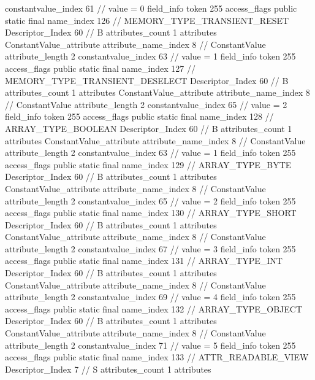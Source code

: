 {{{{{{{					constantvalue_index	61		// value = 0
				}
				}
			}
			field_info {
				token	255
				access_flags	public static final
				name_index	126		// MEMORY_TYPE_TRANSIENT_RESET
				Descriptor_Index	60		// B
				attributes_count	1
				attributes {
				ConstantValue_attribute {
					attribute_name_index	8		// ConstantValue
					attribute_length	2
					constantvalue_index	63		// value = 1
				}
				}
			}
			field_info {
				token	255
				access_flags	public static final
				name_index	127		// MEMORY_TYPE_TRANSIENT_DESELECT
				Descriptor_Index	60		// B
				attributes_count	1
				attributes {
				ConstantValue_attribute {
					attribute_name_index	8		// ConstantValue
					attribute_length	2
					constantvalue_index	65		// value = 2
				}
				}
			}
			field_info {
				token	255
				access_flags	public static final
				name_index	128		// ARRAY_TYPE_BOOLEAN
				Descriptor_Index	60		// B
				attributes_count	1
				attributes {
				ConstantValue_attribute {
					attribute_name_index	8		// ConstantValue
					attribute_length	2
					constantvalue_index	63		// value = 1
				}
				}
			}
			field_info {
				token	255
				access_flags	public static final
				name_index	129		// ARRAY_TYPE_BYTE
				Descriptor_Index	60		// B
				attributes_count	1
				attributes {
				ConstantValue_attribute {
					attribute_name_index	8		// ConstantValue
					attribute_length	2
					constantvalue_index	65		// value = 2
				}
				}
			}
			field_info {
				token	255
				access_flags	public static final
				name_index	130		// ARRAY_TYPE_SHORT
				Descriptor_Index	60		// B
				attributes_count	1
				attributes {
				ConstantValue_attribute {
					attribute_name_index	8		// ConstantValue
					attribute_length	2
					constantvalue_index	67		// value = 3
				}
				}
			}
			field_info {
				token	255
				access_flags	public static final
				name_index	131		// ARRAY_TYPE_INT
				Descriptor_Index	60		// B
				attributes_count	1
				attributes {
				ConstantValue_attribute {
					attribute_name_index	8		// ConstantValue
					attribute_length	2
					constantvalue_index	69		// value = 4
				}
				}
			}
			field_info {
				token	255
				access_flags	public static final
				name_index	132		// ARRAY_TYPE_OBJECT
				Descriptor_Index	60		// B
				attributes_count	1
				attributes {
				ConstantValue_attribute {
					attribute_name_index	8		// ConstantValue
					attribute_length	2
					constantvalue_index	71		// value = 5
				}
				}
			}
			field_info {
				token	255
				access_flags	public static final
				name_index	133		// ATTR_READABLE_VIEW
				Descriptor_Index	7		// S
				attributes_count	1
				attributes {
}}}}}}

